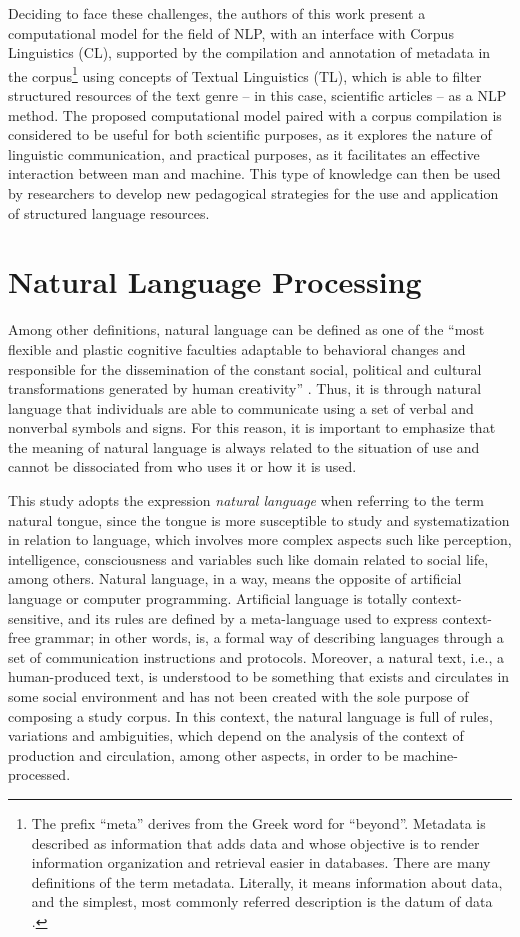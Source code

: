 \documentclass[english]{textolivre}
\begin{document}
Deciding to face these challenges, the authors of this work present a computational model for the field of NLP, with an interface with Corpus Linguistics (CL), supported by the compilation and annotation of metadata in the corpus\footnote{The prefix “meta” derives from the Greek word for “beyond”. Metadata is described as information that adds data and whose objective is to render information organization and retrieval easier in databases.  There are many definitions of the term metadata. Literally, it means information about data, and the simplest, most commonly referred description is the datum of data \cite{kucuk_application_2000}.} using concepts of Textual Linguistics (TL), which is able to filter structured resources of the text genre – in this case, scientific articles – as a NLP method. The proposed computational model paired with a corpus compilation is considered to be useful for both scientific purposes, as it explores the nature of linguistic communication, and practical purposes, as it facilitates an effective interaction between man and machine. This type of knowledge can then be used by researchers to develop new pedagogical strategies for the use and application of structured language resources.

\section{Natural Language Processing}\label{sec-normas}
Among other definitions, natural language can be defined as one of the “most flexible and plastic cognitive faculties adaptable to behavioral changes and responsible for the dissemination of the constant social, political and cultural transformations generated by human creativity” \cite[p. 7]{marcuschi_generos_2004}. Thus, it is through natural language that individuals are able to communicate using a set of verbal and nonverbal symbols and signs. For this reason, it is important to emphasize that the meaning of natural language is always related to the situation of use and cannot be dissociated from who uses it or how it is used.

This study adopts the expression \textit{natural language} when referring to the term natural tongue, since the tongue is more susceptible to study and systematization in relation to language, which involves more complex aspects such like perception, intelligence, consciousness and variables such like domain related to social life, among others. Natural language, in a way, means the opposite of artificial language or computer programming. Artificial language is totally context-sensitive, and its rules are defined by a meta-language used to express context-free grammar; in other words, is, a formal way of describing languages through a set of communication instructions and protocols. Moreover, a natural text, i.e., a human-produced text, is understood to be something that exists and circulates in some social environment and has not been created with the sole purpose of composing a study corpus. In this context, the natural language is full of rules, variations and ambiguities, which depend on the analysis of the context of production and circulation, among other aspects, in order to be machine-processed.
\end{document}

